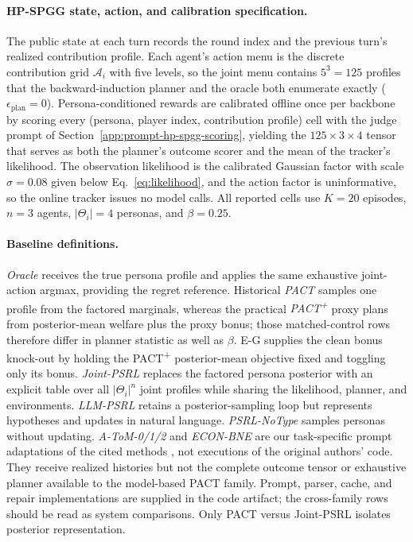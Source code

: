 \paragraph{HP-SPGG state, action, and calibration specification.}
The public state at each turn records the round index and the previous turn's realized contribution profile. Each agent's action menu is the discrete contribution grid $\mathcal A_i$ with five levels, so the joint menu contains $5^3{=}125$ profiles that the backward-induction planner and the oracle both enumerate exactly ($\epsilon_{\mathrm{plan}}{=}0$). Persona-conditioned rewards are calibrated offline once per backbone by scoring every (persona, player index, contribution profile) cell with the judge prompt of Section~\ref{app:prompt-hp-spgg-scoring}, yielding the $125\times3\times4$ tensor that serves as both the planner's outcome scorer and the mean of the tracker's likelihood. The observation likelihood is the calibrated Gaussian factor with scale $\sigma{=}0.08$ given below Eq.~\eqref{eq:likelihood}, and the action factor is uninformative, so the online tracker issues no model calls. All reported cells use $K{=}20$ episodes, $n{=}3$ agents, $|\Theta_i|{=}4$ personas, and $\beta{=}0.25$.

\paragraph{Baseline definitions.}
\emph{Oracle} receives the true persona profile and applies the same exhaustive joint-action argmax, providing the regret reference. Historical \emph{PACT} samples one profile from the factored marginals, whereas the practical \emph{PACT\textsuperscript{+}} proxy plans from posterior-mean welfare plus the proxy bonus; those matched-control rows therefore differ in planner statistic as well as $\beta$. E-G supplies the clean bonus knock-out by holding the PACT\textsuperscript{+} posterior-mean objective fixed and toggling only its bonus. \emph{Joint-PSRL} replaces the factored persona posterior with an explicit table over all $|\Theta_i|^n$ joint profiles while sharing the likelihood, planner, and environments. \emph{LLM-PSRL} retains a posterior-sampling loop but represents hypotheses and updates in natural language. \emph{PSRL-NoType} samples personas without updating. \emph{A-ToM-0/1/2} and \emph{ECON-BNE} are our task-specific prompt adaptations of the cited methods \citep{mu2026adaptive,yi2025debate}, not executions of the original authors' code. They receive realized histories but not the complete outcome tensor or exhaustive planner available to the model-based PACT family. Prompt, parser, cache, and repair implementations are supplied in the code artifact; the cross-family rows should be read as system comparisons. Only PACT versus Joint-PSRL isolates posterior representation.

